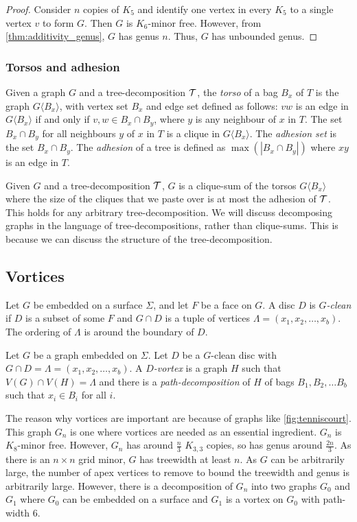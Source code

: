 \begin{proof}
	Consider $n$ copies of $K_5$ and identify one vertex in every $K_5$ to a single vertex $v$ to form $G$. Then $G$ is $K_6$-minor free. However, from \cref{thm:additivity_genus}, $G$ has genus $n$. Thus, $G$ has unbounded genus. 
\end{proof}

\subsubsection{Torsos and adhesion}\label{sssec:Torsos and Adhesion}
Given a graph \(G\) and a tree-decomposition \(\mathcal{T}\), the \textit{torso} of a bag \(B_x\) of \(T\) is the graph \(G\langle B_x \rangle\), with vertex set $B_x$ and edge set defined as follows: \(vw\) is an edge in \(G\langle B_x \rangle\) if and only if \(v,w \in B_x \cap B_y\), where \(y\) is any neighbour of \(x\) in \(T\). The set \(B_x \cap B_y\) for all neighbours \(y\) of \(x\) in \(T\) is a clique in \(G\langle B_x \rangle\).
The \textit{adhesion set} is the set \(B_x \cap B_y\). 
The \textit{adhesion} of a tree is defined as \(\max(|B_x \cap B_y|)\) where \(xy\) is an edge in \(T\).

Given \(G\) and a tree-decomposition \(\mathcal{T}\), \(G\) is a clique-sum of the torsos \(G\langle B_x \rangle\) where the size of the cliques that we paste over is at most the adhesion of $\mathcal{T}$. This holds for any arbitrary tree-decomposition.
We will discuss decomposing graphs in the language of tree-decompositions, rather than clique-sums. This is because we can discuss the structure of the tree-decomposition.

\subsection{Vortices}\label{sssec:vortices}
Let \(G\) be embedded on a surface \(\Sigma\), and let \(F\) be a face on \(G\). A disc $D$ is \textit{$G$-clean} if $D$ is a subset of some $F$ and $G \cap D$ is a tuple of vertices \(\Lambda = (x_1, x_2, \ldots, x_b)\). The ordering of $\Lambda$ is around the boundary of $D$. 
\par
Let $G$ be a graph embedded on $\Sigma$. Let $D$ be a $G$-clean disc with $G \cap D = \Lambda = (x_1, x_2, \ldots, x_b)$. A \textit{$D$-vortex} is a graph $H$ such that $V(G) \cap V(H) = \Lambda$ and there is a \textit{path-decomposition} of \(H\) of bags \(B_1, B_2, \ldots B_b\) such that \(x_i \in B_i\) for all \(i\).
\par
The reason why vortices are important are because of graphs like \cref{fig:tenniscourt}. This graph $G_n$ is one where vortices are needed as an essential ingredient. $G_n$ is $K_8$-minor free. However, $G_n$ has around $\frac{n}{3}$ $K_{3,3}$ copies, so has genus around $\frac{2n}{3}$. As there is an $n \times n$ grid minor, $G$ has treewidth at least $n$. As $G$ can be arbitrarily large, the number of apex vertices to remove to bound the treewidth and genus is arbitrarily large. However, there is a decomposition of $G_n$ into two graphs $G_0$ and $G_1$ where $G_0$ can be embedded on a surface and $G_1$ is a vortex on $G_0$ with path-width 6. 

